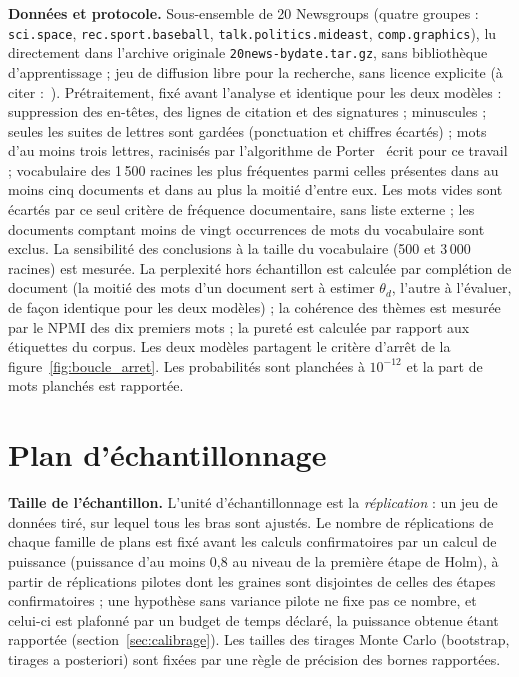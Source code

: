 \textbf{Données et protocole. }Sous-ensemble de 20 Newsgroups (quatre groupes : \texttt{sci.space}, \texttt{rec.sport.baseball}, \texttt{talk.politics.mideast}, \texttt{comp.graphics}), lu directement dans l'archive originale \texttt{20news-bydate.tar.gz}, sans bibliothèque d'apprentissage ; jeu de diffusion libre pour la recherche, sans licence explicite (à citer :~\cite{lang1995}). Prétraitement, fixé avant l'analyse et identique pour les deux modèles : suppression des en-têtes, des lignes de citation et des signatures ; minuscules ; seules les suites de lettres sont gardées (ponctuation et chiffres écartés) ; mots d'au moins trois lettres, racinisés par l'algorithme de Porter~\cite{porter1980} écrit pour ce travail ; vocabulaire des 1\,500 racines les plus fréquentes parmi celles présentes dans au moins cinq documents et dans au plus la moitié d'entre eux. Les mots vides sont écartés par ce seul critère de fréquence documentaire, sans liste externe ; les documents comptant moins de vingt occurrences de mots du vocabulaire sont exclus. La sensibilité des conclusions à la taille du vocabulaire (500 et 3\,000 racines) est mesurée. La perplexité hors échantillon est calculée par complétion de document (la moitié des mots d'un document sert à estimer $\theta_d$, l'autre à l'évaluer, de façon identique pour les deux modèles) ; la cohérence des thèmes est mesurée par le NPMI des dix premiers mots ; la pureté est calculée par rapport aux étiquettes du corpus. Les deux modèles partagent le critère d'arrêt de la figure~\ref{fig:boucle_arret}. Les probabilités sont planchées à $10^{-12}$ et la part de mots planchés est rapportée.

\section{Plan d'échantillonnage}\label{sec:echantillonnage}
\textbf{Taille de l'échantillon. }L'unité d'échantillonnage est la \emph{réplication} : un jeu de données tiré, sur lequel tous les bras sont ajustés. Le nombre de réplications de chaque famille de plans est fixé avant les calculs confirmatoires par un calcul de puissance (puissance d'au moins 0,8 au niveau de la première étape de Holm), à partir de réplications pilotes dont les graines sont disjointes de celles des étapes confirmatoires ; une hypothèse sans variance pilote ne fixe pas ce nombre, et celui-ci est plafonné par un budget de temps déclaré, la puissance obtenue étant rapportée (section~\ref{sec:calibrage}). Les tailles des tirages Monte Carlo (bootstrap, tirages a posteriori) sont fixées par une règle de précision des bornes rapportées.

